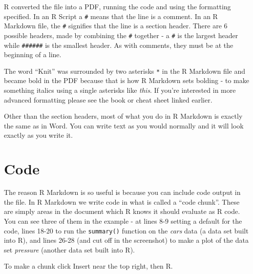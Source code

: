 \documentclass[
  a4paper,
]{krantz}
\begin{document}
R converted the file into a PDF, running the code and using
the formatting specified. In an R Script a \texttt{\#} means
that the line is a comment. In an R Markdown file, the
\texttt{\#} signifies that the line is a section header.
There are 6 possible headers, made by combining the
\texttt{\#} together - a \texttt{\#} is the largest header
while \texttt{\#\#\#\#\#\#} is the smallest header. As with
comments, they must be at the beginning of a line.

The word ``Knit'' was surrounded by two asterisks \texttt{*}
in the R Markdown file and became bold in the PDF because
that is how R Markdown sets bolding - to make something
italics using a single asterisks like \emph{this}. If you're
interested in more advanced formatting please see the book
or cheat sheet linked earlier.

Other than the section headers, most of what you do in R
Markdown is exactly the same as in Word. You can write text
as you would normally and it will look exactly as you write
it.

\hypertarget{code-1}{%
\section{Code}\label{code-1}}

The reason R Markdown is so useful is because you can
include code output in the file. In R Markdown we write code
in what is called a ``code chunk''. These are simply areas
in the document which R knows it should evaluate as R code.
You can see three of them in the example - at lines 8-9
setting a default for the code, lines 18-20 to run the
\texttt{summary()} function on the \emph{cars} data (a data
set built into R), and lines 26-28 (and cut off in the
screenshot) to make a plot of the data set \emph{pressure}
(another data set built into R).

To make a chunk click Insert near the top right, then R.
\end{document}
